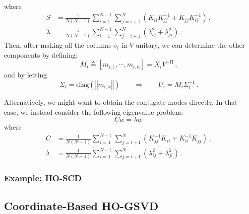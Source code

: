 \documentclass[10pt]{article}
\newcommand{\norm}[1]{\left\Vert#1\right\Vert}
\begin{document}
where
\begin{equation}
\begin{aligned}
    S & = \frac{1}{N(N-1)}\sum_{i=1}^{N-1} \sum_{j=i+1}^N \left(K_{ii}K_{jj}^{-1}+K_{jj}K_{ii}^{-1}\right)\,,\\
    \lambda & = \frac{1}{N(N-1)}\sum_{i=1}^{N-1} \sum_{j=i+1}^N \left(\lambda^2_{ij}+\lambda^2_{ji}\right)\,.
\end{aligned}    
\end{equation}
Then, after making all the columns $v_i$ in $V$ unitary, we can determine the other components by defining:
\begin{equation}
    M_i\triangleq\left[m_{i,1}, \cdots, m_{i,n} \right] = X_i V^\mathrm{-H}\,,
\end{equation}
and by letting
\begin{equation}
    \Sigma_{i} = \mathrm{diag} \left(\norm{m_{i,k}}\right) \qquad \Rightarrow \qquad U_i = M_i \Sigma_{i}^{-1}\,.
\end{equation}

Alternatively, we might want to obtain the conjugate modes directly.
In that case, we instead consider the following eigenvalue problem:
\begin{equation}
     C w = \lambda w\,
\end{equation}
where
\begin{equation}
\begin{aligned}
    C & = \frac{1}{N(N-1)}\sum_{i=1}^{N-1} \sum_{j=i+1}^N \left(K_{jj}^{-1}K_{ii}+K_{ii}^{-1}K_{jj}\right)\,,\\
    \lambda & = \frac{1}{N(N-1)}\sum_{i=1}^{N-1} \sum_{j=i+1}^N \left(\lambda^2_{ij}+\lambda^2_{ji}\right)\,.
\end{aligned}    
\end{equation}


\subsubsection{Example: HO-SCD}


\subsection{Coordinate-Based HO-GSVD}
\end{document}
